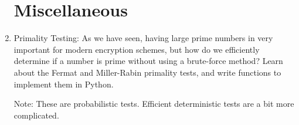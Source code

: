 \documentclass[12pt]{amsart}
\theoremstyle{definition}
\theoremstyle{remark}
\numberwithin{equation}{section}
\begin{document}
\begin{enumerate}
\section{Miscellaneous}
\item Primality Testing: As we have seen, having large prime numbers in very important for modern encryption schemes, but how do we efficiently determine if a number is prime without using a brute-force method? Learn about the Fermat and Miller-Rabin primality tests, and write functions to implement them in Python. 

\noindent Note: These are probabilistic tests. Efficient deterministic tests are a bit more complicated. 
\end{enumerate}
\end{document}
